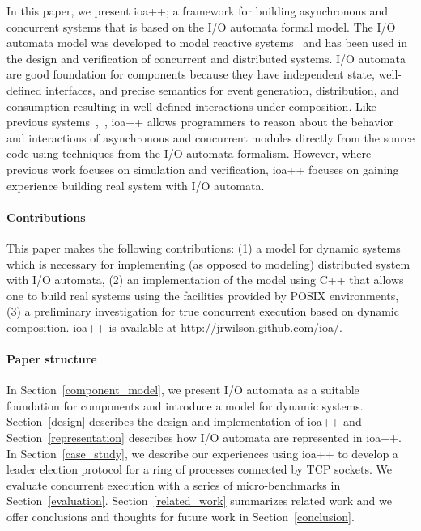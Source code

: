 In this paper, we present ioa++; a framework for building asynchronous and concurrent systems that is based on the I/O automata formal model.
The I/O automata model was developed to model reactive systems~\cite{lynch1987hierarchical} and has been used in the design and verification of concurrent and distributed systems.
I/O automata are good foundation for components because they have independent state, well-defined interfaces, and precise semantics for event generation, distribution, and consumption resulting in well-defined interactions under composition.
Like previous systems~\cite{goldman1990distributed},~\cite{georgiou2009automated}, ioa++ allows programmers to reason about the behavior and interactions of asynchronous and concurrent modules directly from the source code using techniques from the I/O automata formalism.
However, where previous work focuses on simulation and verification, ioa++ focuses on gaining experience building real system with I/O automata.

\paragraph*{Contributions}
This paper makes the following contributions:
(1)  a model for dynamic systems which is necessary for implementing (as opposed to modeling) distributed system with I/O automata,
(2)  an implementation of the model using C++ that allows one to build real systems using the facilities provided by POSIX environments,
(3)  a preliminary investigation for true concurrent execution based on dynamic composition.
ioa++ is available at \url{http://jrwilson.github.com/ioa/}.

\paragraph*{Paper structure}
In Section~\ref{component_model}, we present I/O automata as a suitable foundation for components and introduce a model for dynamic systems.
Section~\ref{design} describes the design and implementation of ioa++ and Section~\ref{representation} describes how I/O automata are represented in ioa++.
In Section~\ref{case_study}, we describe our experiences using ioa++ to develop a leader election protocol for a ring of processes connected by TCP sockets.
We evaluate concurrent execution with a series of micro-benchmarks in Section~\ref{evaluation}.
Section~\ref{related_work} summarizes related work and we offer conclusions and thoughts for future work in Section~\ref{conclusion}.

